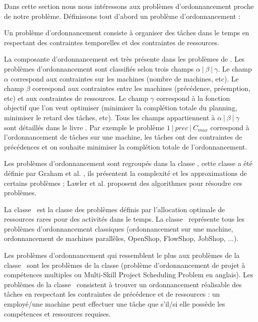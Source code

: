
Dans cette section nous nous intéressons aux problèmes d'ordonnancement proche de notre problème.
Définissons tout d'abord un problème d'ordonnancement :
\begin{mydef}
Un problème d'ordonnancement consiste à organiser des tâches dans le temps en respectant des contraintes temporelles et des contraintes de ressources.
\end{mydef} 
La composante d'ordonnancement est très présente dans les problèmes de \wsrp.
Les problèmes d'ordonnancement sont classifiés selon trois champs $\alpha~|~\beta~|~\gamma$.
Le champ $\alpha$ correspond aux contraintes sur les machines (nombre de machines, etc).
Le champ $\beta$ correspond aux contraintes entre les machines (précédence, préemption, etc) et aux contraintes de ressources.
Le champ $\gamma$ correspond à la fonction objectif que l'on veut optimiser (minimiser la complétion totale du planning, minimiser le retard des tâches, etc). 
Tous les champs appartiennent à $\alpha~|~\beta~|~\gamma$ sont détaillés dans le livre \cite{blazewicz2007handbook}.
Par exemple le problème $1~|~\textit{prec}~|~C_{max}$ correspond à l'ordonnancement de tâches sur une machine, les tâches ont des contraintes de précédences et on souhaite minimiser la complétion totale de l'ordonnancement.

Les problèmes d'ordonnancement sont regroupés dans la classe \ssp, cette classe a été définie par Graham et al. \cite{Graham1979}, ils présentent la complexité et les approximations de certains problèmes ; Lawler et al. \cite{Lawler1993} proposent des algorithmes pour résoudre ces problèmes.
\begin{mydef}
La classe \ssp ~est la classe des problèmes définis par l'allocation optimale de ressources rares pour des activités dans le temps.
La classe \ssp ~représente tous les problèmes d'ordonnancement classiques (ordonnancement sur une machine, ordonnancement de machines parallèles, OpenShop, FlowShop, JobShop, $\ldots$).
\end{mydef}

Les problèmes d'ordonnancement qui ressemblent le plus aux problèmes de la classe \wsrp ~sont les problèmes de la classe \mpsp (problème d'ordonnancement de projet à compétences multiples ou Multi-Skill Project Scheduling Problem en anglais). Les problèmes de la classe \mpsp ~consistent à trouver un ordonnancement réalisable des tâches en respectant les contraintes de précédence et de ressources : un employé/une machine peut effectuer une tâche que s'il/si elle possède les compétences et ressources requises.

